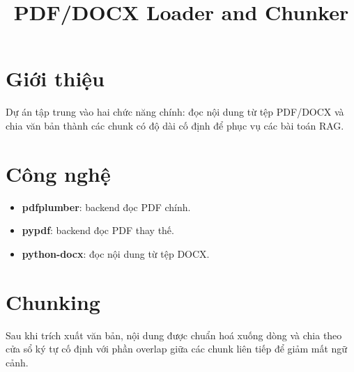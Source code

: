 \documentclass{article}
\title{PDF/DOCX Loader and Chunker}
\author{}
\date{}
\begin{document}
\maketitle

\section{Giới thiệu}

Dự án tập trung vào hai chức năng chính: đọc nội dung từ tệp PDF/DOCX
và chia văn bản thành các chunk có độ dài cố định để phục vụ các bài toán RAG.

\section{Công nghệ}

\begin{itemize}
  \item \textbf{pdfplumber}: backend đọc PDF chính.
  \item \textbf{pypdf}: backend đọc PDF thay thế.
  \item \textbf{python-docx}: đọc nội dung từ tệp DOCX.
\end{itemize}

\section{Chunking}

Sau khi trích xuất văn bản, nội dung được chuẩn hoá xuống dòng và chia
theo cửa sổ ký tự cố định với phần overlap giữa các chunk liên tiếp để
giảm mất ngữ cảnh.
\end{document}
